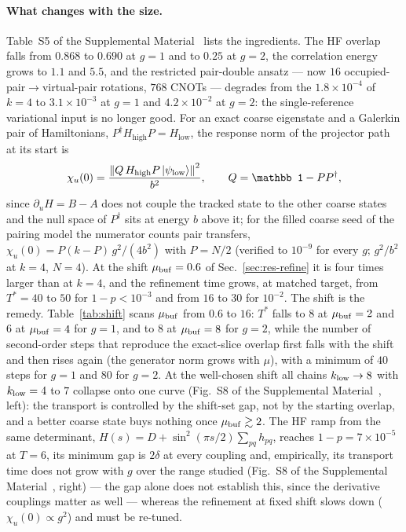 \documentclass[
  aps,            %
  prc,            %
  reprint,        %
  superscriptaddress,
  floatfix,
  nofootinbib
]{revtex4-2}
\newcommand{\Hlow}{H_{\mathrm{low}}}
\newcommand{\Hhigh}{H_{\mathrm{high}}}
\newcommand{\SM}{Supplemental Material~\cite{SM}}
\begin{document}
\paragraph{What changes with the size.}
Table~S5 of the \SM{} lists the ingredients.  The HF overlap falls from
$0.868$ to $0.690$ at $g=1$ and to $0.25$ at $g=2$, the correlation energy
grows to $1.1$ and $5.5$, and the restricted pair-double ansatz --- now
$16$ occupied-pair$\to$virtual-pair rotations, $768$ CNOTs --- degrades from
the $1.8\times10^{-4}$ of $k=4$ to $3.1\times10^{-3}$ at $g=1$ and
$4.2\times10^{-2}$ at $g=2$: the single-reference variational input is no
longer good.  For an exact coarse eigenstate and a Galerkin pair of
Hamiltonians, $P^\dagger\Hhigh P=\Hlow$, the response norm of the projector
path at its start is
\begin{equation}
  \chi_u(0)=\frac{\norm{Q\,\Hhigh P\ket{\psi_{\rm low}}}^2}{b^2},
  \qquad Q=\mathbb1-PP^\dagger,
  \label{eq:chi0}
\end{equation}
since $\partial_uH=B-A$ does not couple the tracked state to the other
coarse states and the null space of $P^\dagger$ sits at energy $b$ above it;
for the filled coarse seed of the pairing model the numerator counts pair
transfers, $\chi_u(0)=P(k-P)\,g^2/(4b^2)$ with $P=N/2$ (verified to
$10^{-9}$ for every $g$; $g^2/b^2$ at $k=4$, $N=4$).  At the shift
$\mu_{\rm buf}=0.6$ of Sec.~\ref{sec:res-refine} it is four times larger
than at $k=4$, and the refinement time grows, at matched target, from
$T^*=40$ to $50$ for $1-p<10^{-3}$ and from $16$ to $30$ for $10^{-2}$.
The shift is the remedy.
Table~\ref{tab:shift} scans $\mu_{\rm buf}$ from $0.6$ to $16$: $T^*$ falls to $8$ at $\mu_{\rm buf}=2$ and $6$ at $\mu_{\rm buf}=4$
for $g=1$, and to $8$ at $\mu_{\rm buf}=8$ for $g=2$, while the number of
second-order steps that reproduce the exact-slice overlap first falls with
the shift and then rises again (the generator norm grows with $\mu$), with a
minimum of $40$ steps for $g=1$ and $80$ for $g=2$.  At the well-chosen
shift all chains $k_{\rm low}\to8$ with $k_{\rm low}=4$ to $7$ collapse onto
one curve (Fig.~S8 of the \SM{}, left): the transport is controlled by the
shift-set gap, not by the starting overlap, and a better coarse state buys
nothing once $\mu_{\rm buf}\gtrsim2$.  The HF ramp from the same
determinant, $H(s)=D+\sin^2(\pi s/2)\sum_{pq}h_{pq}$, reaches
$1-p=7\times10^{-5}$ at $T=6$, its minimum gap is $2\delta$ at every
coupling and, empirically, its transport time does not grow with $g$ over
the range studied (Fig.~S8 of the \SM{}, right) --- the gap alone does not
establish this, since the derivative couplings matter as well --- whereas
the refinement at fixed shift slows down ($\chi_u(0)\propto g^2$) and must
be re-tuned.
\end{document}
